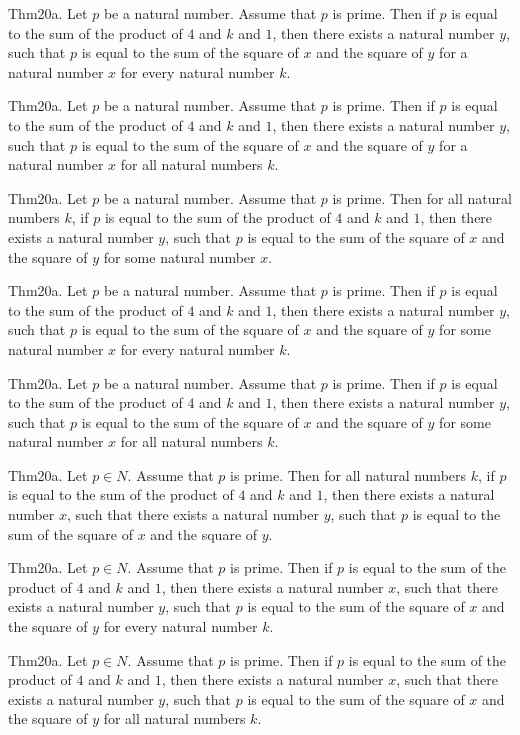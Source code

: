 \documentclass{article}
\begin{document}
Thm20a. Let $p$ be a natural number. Assume that $p$ is prime. Then if $p$ is equal to the sum of the product of $4$ and $k$ and $1$, then there exists a natural number $y$, such that $p$ is equal to the sum of the square of $x$ and the square of $y$ for a natural number $x$ for every natural number $k$.

Thm20a. Let $p$ be a natural number. Assume that $p$ is prime. Then if $p$ is equal to the sum of the product of $4$ and $k$ and $1$, then there exists a natural number $y$, such that $p$ is equal to the sum of the square of $x$ and the square of $y$ for a natural number $x$ for all natural numbers $k$.

Thm20a. Let $p$ be a natural number. Assume that $p$ is prime. Then for all natural numbers $k$, if $p$ is equal to the sum of the product of $4$ and $k$ and $1$, then there exists a natural number $y$, such that $p$ is equal to the sum of the square of $x$ and the square of $y$ for some natural number $x$.

Thm20a. Let $p$ be a natural number. Assume that $p$ is prime. Then if $p$ is equal to the sum of the product of $4$ and $k$ and $1$, then there exists a natural number $y$, such that $p$ is equal to the sum of the square of $x$ and the square of $y$ for some natural number $x$ for every natural number $k$.

Thm20a. Let $p$ be a natural number. Assume that $p$ is prime. Then if $p$ is equal to the sum of the product of $4$ and $k$ and $1$, then there exists a natural number $y$, such that $p$ is equal to the sum of the square of $x$ and the square of $y$ for some natural number $x$ for all natural numbers $k$.

Thm20a. Let $p \in N$. Assume that $p$ is prime. Then for all natural numbers $k$, if $p$ is equal to the sum of the product of $4$ and $k$ and $1$, then there exists a natural number $x$, such that there exists a natural number $y$, such that $p$ is equal to the sum of the square of $x$ and the square of $y$.

Thm20a. Let $p \in N$. Assume that $p$ is prime. Then if $p$ is equal to the sum of the product of $4$ and $k$ and $1$, then there exists a natural number $x$, such that there exists a natural number $y$, such that $p$ is equal to the sum of the square of $x$ and the square of $y$ for every natural number $k$.

Thm20a. Let $p \in N$. Assume that $p$ is prime. Then if $p$ is equal to the sum of the product of $4$ and $k$ and $1$, then there exists a natural number $x$, such that there exists a natural number $y$, such that $p$ is equal to the sum of the square of $x$ and the square of $y$ for all natural numbers $k$.
\end{document}
